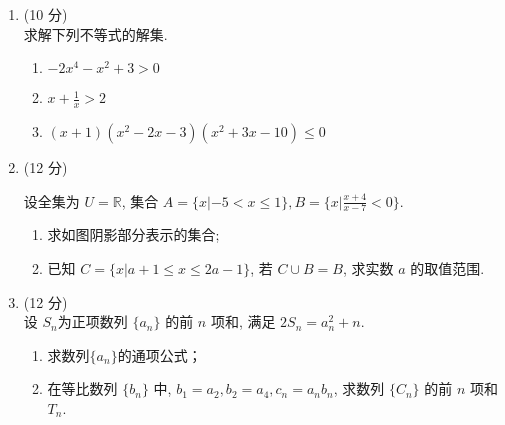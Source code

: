 \documentclass[17pt,twoside,space]{ctexart}
\begin{document}
\begin{enumerate}[itemsep=-0.3em,topsep=0pt,resume]%

\item (10 分)\\
求解下列不等式的解集. 
\begin{enumerate}[itemsep=-0.3em,label={(\arabic*)},topsep=0pt,labelsep=.5em,leftmargin=1.7em]
	\item $-2x^4 - x^2 + 3 > 0$
	\item $x + \frac{1}{x} > 2$ 
	\item $(x+1)(x^2-2x-3)(x^2+3x-10) \leqslant 0$ 
	\end{enumerate}

	\vspace{180pt}

\item (12 分)\\
\def\firstcircle{(-0.4, 0) ellipse (19pt and 16pt)}
\def\secondcircle{(0.4, 0) ellipse (17pt and 15pt)}
\begin{minipage}[b]{0.65\linewidth}
	设全集为 $U=\mathbb{R}$, 集合 $A=\{x|-5 < x \leqslant 1\}, B=\{x|\frac{x+4}{x-7} < 0\}$.
	\begin{enumerate}[itemsep=-0.3em,label={(\arabic*)},topsep=0pt,labelsep=.5em,leftmargin=1.7em]
		\item 求如图阴影部分表示的集合; 
		\item 已知 $C = \{x|a+1 \leqslant x \leqslant 2a-1\}$, 若 $C \cup B = B$, 求实数 $a$ 的取值范围. 
		\end{enumerate}
	\end{minipage}
	\hfill
	\begin{minipage}[b]{0.35\linewidth}
	\end{minipage}

	
    
\newpage

\item (12 分)\\
设 $S_n$为正项数列 $\{a_n\}$ 的前 $n$ 项和, 满足 $2S_n = a_n^2 + n$. 
    \begin{enumerate}[itemsep=-0.3em,label={(\arabic*)},topsep=0pt,labelsep=.5em,leftmargin=1.7em]
	\item 求数列$\{a_n\}$的通项公式；
	\item 在等比数列 $\{b_n\}$ 中, $b_1=a_2, b_2=a_4, c_n=a_nb_n$, 求数列 $\{C_n\}$ 的前 $n$ 项和 $T_n$.
	\end{enumerate}


\end{enumerate}
\end{document}
